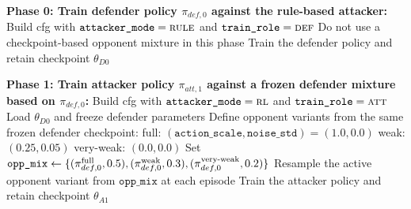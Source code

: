 \begin{algorithm}[H]
\caption{Phased Alternating Training Cycle with Opponent Randomization}
\label{alg:ppo_phases}
\begin{algorithmic}[1]
\State \textbf{Phase 0: Train defender policy $\pi_{def,0}$ against the rule-based attacker:}
\State \hspace{1em} Build cfg with $\texttt{attacker\_mode}=\textsc{rule}$ and $\texttt{train\_role}=\textsc{def}$
\State \hspace{1em} Do not use a checkpoint-based opponent mixture in this phase
\State \hspace{1em} Train the defender policy and retain checkpoint $\theta_{D0}$

\State \textbf{Phase 1: Train attacker policy $\pi_{att,1}$ against a frozen defender mixture based on $\pi_{def,0}$:}
\State \hspace{1em} Build cfg with $\texttt{attacker\_mode}=\textsc{rl}$ and $\texttt{train\_role}=\textsc{att}$
\State \hspace{1em} Load $\theta_{D0}$ and freeze defender parameters
\State \hspace{1em} Define opponent variants from the same frozen defender checkpoint:
\Statex \hspace{2em} full: $(\texttt{action\_scale},\texttt{noise\_std})=(1.0,0.0)$
\Statex \hspace{2em} weak: $(0.25,0.05)$
\Statex \hspace{2em} very-weak: $(0.0,0.0)$
\State \hspace{1em} Set
\Statex \hspace{2em}
$\texttt{opp\_mix}\gets\{(\pi_{def,0}^{\text{full}},0.5),(\pi_{def,0}^{\text{weak}},0.3),(\pi_{def,0}^{\text{very\mbox{-}weak}},0.2)\}$
\State \hspace{1em} Resample the active opponent variant from $\texttt{opp\_mix}$ at each episode
\State \hspace{1em} Train the attacker policy and retain checkpoint $\theta_{A1}$


\end{algorithmic}
\end{algorithm}
